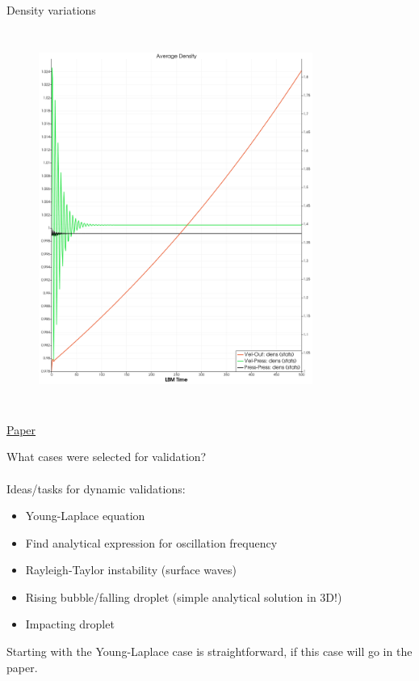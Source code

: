 \documentclass[8pt]{beamer}
\begin{document}
\begin{frame}{Density variations}
\begin{columns}
\begin{figure}
				\includegraphics[width=0.8\textwidth]{pics/globalDenBox.png}
				\label{}
			\end{figure}
		\end{columns}
	\end{frame}
	
	\begin{frame}{\href{https://www.overleaf.com/project/5f5cfacb13ed640001eeb63d}{\color{green}Paper}}
		
		What cases were selected for validation?\\~\\
		
		Ideas/tasks for dynamic validations:
		\begin{itemize}
			\item Young-Laplace equation
			\item Find analytical expression for oscillation frequency
			\item Rayleigh-Taylor instability (surface waves)
			\item Rising bubble/falling droplet (simple analytical solution in 3D!)
			\item Impacting droplet
		\end{itemize}
	
	Starting with the Young-Laplace case is straightforward, if this case will go in the paper.
	\end{frame}
	
\end{document}
